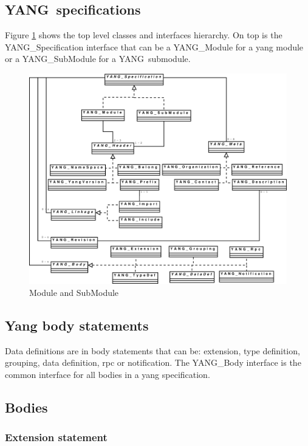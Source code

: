 \documentclass[a4paper]{article}
\newcommand{\y}{YANG}
\begin{document}
\subsection{\y\ specifications}

Figure  \ref{spec}   shows  the  top  level   classes  and  interfaces
hierarchy.  On top is the  YANG\_Specification interface that can be a
YANG\_Module  for  a  yang  module  or a  YANG\_SubModule  for  a  \y\
submodule.

\begin{figure}[htbp]
\begin{center}
\includegraphics[scale = .3]{yspec.eps}
\end{center}
\caption{Module and SubModule}
\label{spec}
\end{figure}

\subsection{Yang body statements}

Data definitions are  in body statements that can  be: extension, type
definition,  grouping,  data  definition,  rpc or  notification.   The
YANG\_Body interface is the common  interface for all bodies in a yang
specification.

\subsection{Bodies}

\subsubsection{Extension statement}
\label{extension:section:global}
\end{document}
